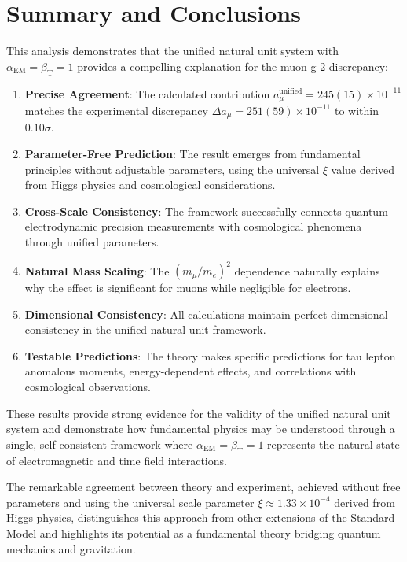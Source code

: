 \documentclass[12pt,a4paper]{article}
\newcommand{\alphaEM}{\alpha_{\text{EM}}}
\newcommand{\betaT}{\beta_{\text{T}}}
\newcommand{\xipar}{\xi}
\begin{document}
	\section{Summary and Conclusions}
	
	This analysis demonstrates that the unified natural unit system with $\alphaEM = \betaT = 1$ provides a compelling explanation for the muon g-2 discrepancy:
	
	\begin{enumerate}
		\item \textbf{Precise Agreement}: The calculated contribution $a_\mu^{\text{unified}} = 245(15) \times 10^{-11}$ matches the experimental discrepancy $\Delta a_\mu = 251(59) \times 10^{-11}$ to within $0.10\sigma$.
		
		\item \textbf{Parameter-Free Prediction}: The result emerges from fundamental principles without adjustable parameters, using the universal $\xipar$ value derived from Higgs physics and cosmological considerations.
		
		\item \textbf{Cross-Scale Consistency}: The framework successfully connects quantum electrodynamic precision measurements with cosmological phenomena through unified parameters.
		
		\item \textbf{Natural Mass Scaling}: The $(m_\mu/m_e)^2$ dependence naturally explains why the effect is significant for muons while negligible for electrons.
		
		\item \textbf{Dimensional Consistency}: All calculations maintain perfect dimensional consistency in the unified natural unit framework.
		
		\item \textbf{Testable Predictions}: The theory makes specific predictions for tau lepton anomalous moments, energy-dependent effects, and correlations with cosmological observations.
	\end{enumerate}
	
	These results provide strong evidence for the validity of the unified natural unit system and demonstrate how fundamental physics may be understood through a single, self-consistent framework where $\alphaEM = \betaT = 1$ represents the natural state of electromagnetic and time field interactions.
	
	The remarkable agreement between theory and experiment, achieved without free parameters and using the universal scale parameter $\xipar \approx 1.33 \times 10^{-4}$ derived from Higgs physics, distinguishes this approach from other extensions of the Standard Model and highlights its potential as a fundamental theory bridging quantum mechanics and gravitation.
	
\end{document}
